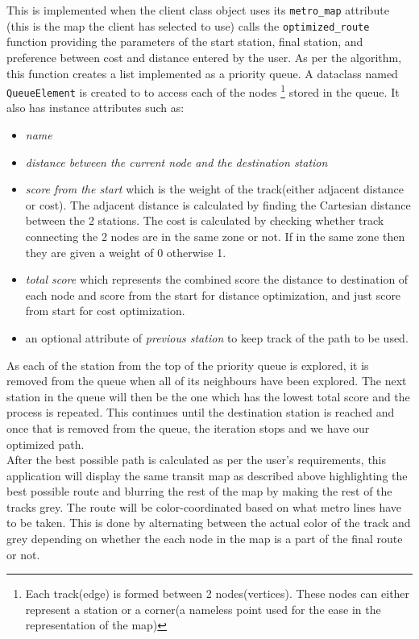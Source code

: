 \documentclass[fontsize=11pt]{article}
\begin{document}
    This is implemented when the client class object uses its \texttt{metro\_map} attribute (this is the map the client has selected to use) calls the \texttt{optimized\_route} function providing the parameters of the start station, final station, and preference between cost and distance entered by the user. As per the algorithm, this function creates a list implemented as a priority queue. A dataclass named \texttt{QueueElement} is created to to access each of the nodes \footnote{Each track(edge) is formed between 2 nodes(vertices). These nodes can either represent a station or a corner(a nameless point used for the ease in the representation of the map)} stored in the queue. It also has instance attributes such as:
    \begin{itemize}
        \item  \textit{name}
        \item \textit{distance between the current node and the destination station }
        \item \textit{score from the start} which is the weight of the track(either adjacent distance or cost). The adjacent distance is calculated by finding the Cartesian distance between the 2 stations. The cost is calculated by checking whether track connecting the 2 nodes are in the same zone or not. If in the same zone then they are given a weight of 0 otherwise 1.
        \item \textit{total score} which represents the combined score the distance to destination of each node and score from the start for distance optimization, and just score from start for cost optimization.
        \item an optional attribute of \textit{previous station} to keep track of the path to be used.
    \end{itemize}
    As each of the station from the top of the priority queue is explored, it is removed from the queue when all of its neighbours have been explored. The next station in the queue will then be the one which has the lowest total score and the process is repeated. This continues until the destination station is reached and once that is removed from the queue, the iteration stops and we have our optimized path.
    \\
    After the best possible path is calculated as per the user's requirements, this application will display the same transit map as described above highlighting the best possible route and blurring the rest of the map by making the rest of the tracks grey. The route will be color-coordinated based on what metro lines have to be taken. This is done by alternating between the actual color of the track and grey depending on whether the each node in the map is a part of the final route or not.
\end{document}
